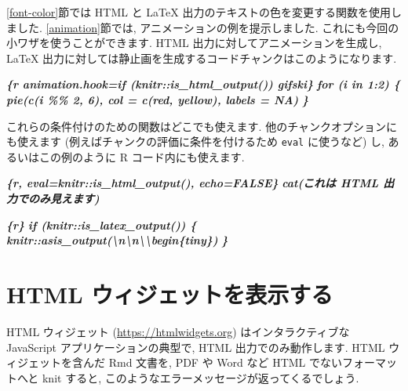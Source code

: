 \documentclass[
  11pt,
  lualatex,ja=standard,jafont=noto]{bxjsreport}
\newenvironment{Shaded}{\begin{snugshade}}{\end{snugshade}}
\newcommand{\InformationTok}[1]{\textcolor[rgb]{0.56,0.35,0.01}{\textbf{\textit{#1}}}}
\begin{document}
\ref{font-color}節では HTML と LaTeX 出力のテキストの色を変更する関数を使用しました. \ref{animation}節では, アニメーションの例を提示しました. これにも今回の小ワザを使うことができます. HTML 出力に対してアニメーションを生成し, LaTeX 出力に対しては静止画を生成するコードチャンクはこのようになります.

\begin{Shaded}
\begin{Highlighting}[]
\InformationTok{\textasciigrave{}\textasciigrave{}\textasciigrave{}\{r animation.hook=if (knitr::is\_html\_output()) \textquotesingle{}gifski\textquotesingle{}\}}
\InformationTok{for (i in 1:2) \{}
\InformationTok{  pie(c(i \%\% 2, 6), col = c(\textquotesingle{}red\textquotesingle{}, \textquotesingle{}yellow\textquotesingle{}), labels = NA)}
\InformationTok{\}}
\InformationTok{\textasciigrave{}\textasciigrave{}\textasciigrave{}}
\end{Highlighting}
\end{Shaded}

これらの条件付けのための関数はどこでも使えます. 他のチャンクオプションにも使えます (例えばチャンクの評価に条件を付けるため \texttt{eval} に使うなど) し, あるいはこの例のように R コード内にも使えます.

\begin{Shaded}
\begin{Highlighting}[]
\InformationTok{\textasciigrave{}\textasciigrave{}\textasciigrave{}\{r, eval=knitr::is\_html\_output(), echo=FALSE\}}
\InformationTok{cat(\textquotesingle{}これは HTML 出力でのみ見えます\textquotesingle{})}
\InformationTok{\textasciigrave{}\textasciigrave{}\textasciigrave{}}

\InformationTok{\textasciigrave{}\textasciigrave{}\textasciigrave{}\{r\}}
\InformationTok{if (knitr::is\_latex\_output()) \{}
\InformationTok{  knitr::asis\_output(\textquotesingle{}\textbackslash{}n\textbackslash{}n\textbackslash{}\textbackslash{}begin\{tiny\}\textquotesingle{})}
\InformationTok{\}}
\InformationTok{\textasciigrave{}\textasciigrave{}\textasciigrave{}}
\end{Highlighting}
\end{Shaded}

\hypertarget{html-widgets}{%
\section{HTML ウィジェットを表示する}\label{html-widgets}}

HTML ウィジェット (\url{https://htmlwidgets.org}) はインタラクティブな JavaScript アプリケーションの典型で, HTML 出力でのみ動作します. HTML ウィジェットを含んだ Rmd 文書を, PDF や Word など HTML でないフォーマットへと knit すると, このようなエラーメッセージが返ってくるでしょう.
\end{document}

